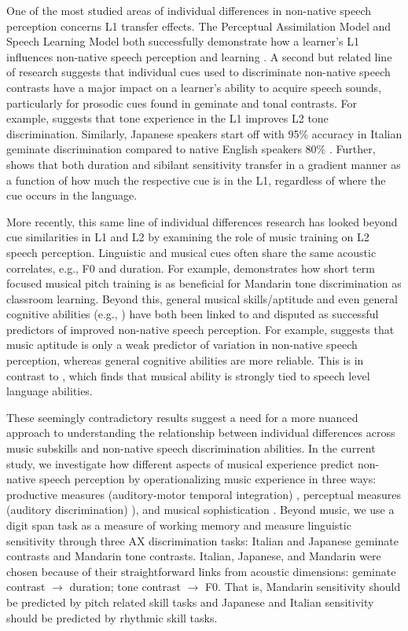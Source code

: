 \documentclass[a4paper]{article}
\begin{document}
One of the most studied areas of individual differences in non-native speech perception concerns L1 transfer effects. The Perceptual Assimilation Model and Speech Learning Model both successfully demonstrate how a learner’s L1 influences non-native speech perception and learning \cite{Flege_95,Best_1995}. A second but related line of research suggests that individual cues used to discriminate non-native speech contrasts have a major impact on a learner's ability to acquire speech sounds, particularly for prosodic cues found in geminate and tonal contrasts. For example, \cite{Francis_2008} suggests that tone experience in the L1 improves L2 tone discrimination.
Similarly, Japanese speakers start off with 95\% accuracy in Italian geminate discrimination compared to native English speakers 80\% \cite{Tsukada_Cox_Hajek_Hirata_2017}. Further, \cite{Pajak_2014} shows that both duration and sibilant sensitivity transfer in a gradient manner as a function of how much the respective cue is in the L1, regardless of where the cue occurs in the language. 

More recently, this same line of individual differences research has looked beyond cue similarities in L1 and L2 by examining the role of music training on L2 speech perception. Linguistic and musical cues often share the same acoustic correlates, e.g., F0 and duration. For example, \cite{Wiener_Bradley_2020} demonstrates how short term focused musical pitch training is as beneficial for Mandarin tone discrimination as classroom learning. Beyond this, general musical skills/aptitude and even general cognitive abilities (e.g., \cite{Zheng_2021}) have both been linked to and disputed as successful predictors of improved non-native speech perception. For example, \cite{Zheng_2021} suggests that music aptitude is only a weak predictor of variation in non-native speech perception, whereas general cognitive abilities are more reliable. This is in contrast to \cite{Slevc_2006}, which finds that musical ability is strongly tied to speech level language abilities. 

These seemingly contradictory results suggest a need for a more nuanced approach to understanding the relationship between individual differences across music subskills and non-native speech discrimination abilities. In the current study, we investigate how different aspects of musical experience predict non-native speech perception by operationalizing music experience in three ways: productive measures (auditory-motor temporal integration) \cite{Kachlicka_Saito_Tierney_2019}, perceptual measures (auditory discrimination) \cite[MET]{Wallentin_Nielsen_Friis-Olivarius_Vuust_Vuust_2010}), and musical sophistication \cite[Goldsmiths-MSI]{Müllensiefen_Gingras_Musil_Stewart_2014}. Beyond music, we use a digit span task as a measure of working memory and measure linguistic sensitivity through three AX discrimination tasks: Italian and Japanese geminate contrasts and Mandarin tone contrasts. Italian, Japanese, and Mandarin were chosen because of their straightforward links from acoustic dimensions: geminate contrast $\rightarrow$ duration;  tone contrast $\rightarrow$ F0. That is, Mandarin sensitivity should be predicted by pitch related skill tasks and Japanese and Italian sensitivity should be predicted by rhythmic skill tasks.
\end{document}
